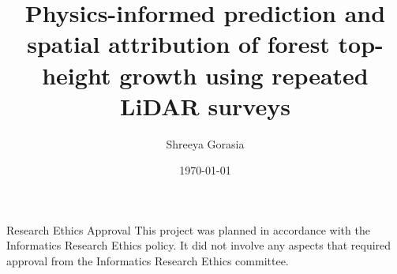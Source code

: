 \documentclass[logo,msc,ai]{infthesis}           %
\begin{document}
\begin{preliminary}

\title{Physics-informed prediction and spatial attribution of forest top-height growth using repeated LiDAR surveys}

\author{Shreeya Gorasia}

\date{\today}



\maketitle

\newenvironment{ethics}
   {\begin{frontenv}{Research Ethics Approval}{\LARGE}}
   {\end{frontenv}\newpage}

\begin{ethics}
This project was planned in accordance with the Informatics Research
Ethics policy. It did not involve any aspects that required approval
from the Informatics Research Ethics committee.


\end{ethics}
\end{preliminary}
\end{document}
